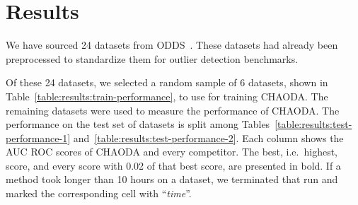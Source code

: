 \section{Results}
\label{sec:results}

We have sourced 24 datasets from ODDS~\cite{rayana2016odds}.
These datasets had already been preprocessed to standardize them for outlier detection benchmarks.

Of these 24 datasets, we selected a random sample of 6 datasets, shown in Table~\ref{table:results:train-performance}, to use for training CHAODA\@.
The remaining datasets were used to measure the performance of CHAODA\@.
The performance on the test set of datasets is split among Tables~\ref{table:results:test-performance-1} and~\ref{table:results:test-performance-2}.
Each column shows the AUC ROC scores of CHAODA and every competitor.
The best, i.e.\ highest, score, and every score with 0.02 of that best score, are presented in bold.
If a method took longer than 10 hours on a dataset, we terminated that run and marked the corresponding cell with ``\textit{time}''.




